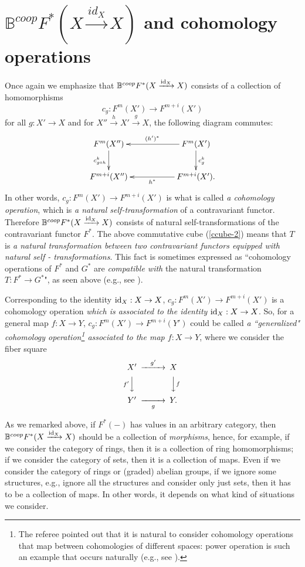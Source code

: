 \documentclass[a4paper]{amsart}
\begin{document}
\section{$ \mathbb B^{coop}F^{*}(X \xrightarrow {id_X} X)$ and cohomology operations}

Once again we emphasize that $\mathbb B^{coop}F^{*}(X \xrightarrow {\operatorname{id}_X} X)$ consists of a collection of homomorphisms
$$c_g: F^m(X') \to F^{m+i}(X')$$
for all $g:X' \to X$  and for $X'' \xrightarrow {h} X' \xrightarrow g X$, the following diagram commutes:
$$
\xymatrix
{F^m(X'') \ar[d]_{c_{g \circ h}^k} && F^m(X')\ar[ll]_{(h')^*} \ar[d]^{c_g^k}\\
F^{m+i}(X'') && F^{m+i}(X') \ar[ll]^{h^*}.
}
$$ 
In other words, $c_g: F^m(X') \to F^{m+i}(X')$ is what is called \emph{a cohomology operation}, which is \emph{a natural self-transformation} of a contravariant functor. Therefore $ \mathbb B^{coop}F^{*}(X \xrightarrow {\operatorname{id}_X} X)$ consists of natural self-transformations of the contravariant functor $F^*$. The above commutative cube (\ref{ccube-2}) means that $T$ is \emph{a natural transformation between two contravariant functors equipped with natural self - transformations}. This fact is sometimes expressed as ``cohomology operations of $F^*$ and $G^*$ are \emph{compatible with} the natural transformation $T: F^* \to G^*$", as seen above (e.g., see \cite{nLab}).
\begin{rem} Corresponding to the identity $\operatorname{id}_X:X \to X$, $c_g: F^m(X') \to F^{m+i}(X')$ is a cohomology operation \emph{which is associated to the identity $\operatorname{id}_X:X \to X$}. So, for a general map $f: X \to Y$,
$c_g: F^m(X') \to F^{m+i}(Y')$ could be called \emph{a ``generalized" cohomology operation\footnote{The referee pointed out that it is natural to consider cohomology operations that map between cohomologies of different spaces: power operation is such an example that occurs naturally (e.g., see \cite{Qui}).} associated to the map $f:X \to Y$}, where we consider
the fiber square \, \, \, 
\begin{equation*}
\CD
X' @> {g'}  >> X\\
@V {f'} VV @VV fV\\
Y' @>> {g} > Y.\\
\endCD
\end{equation*}
\end{rem}
\begin{rem}
As we remarked above, if $F^*(-)$ has values in an arbitrary category, then $ \mathbb B^{coop}F^{*}(X \xrightarrow {\operatorname{id}_X} X)$ should be a collection of \emph{morphisms}, hence, for example, if we consider the category of rings, then it is a collection of ring homomorphisms; if we consider the category of sets, then it is a collection of maps. Even if we consider the category of rings or (graded) abelian groups, if we ignore some structures, e.g., ignore all the structures and consider only just sets, then it has to be a collection of maps. In other words, it depends on what kind of situations we consider. 
\end{rem}
\end{document}
